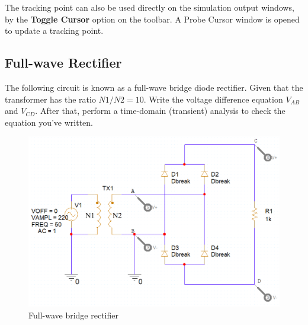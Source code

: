 The tracking point can also be used directly on the simulation output windows, by the \textbf{Toggle Cursor} option on the toolbar. A Probe Cursor window is opened to update a tracking point.




\subsection{Full-wave Rectifier}
The following circuit is known as a full-wave bridge diode rectifier. Given that the transformer has the ratio $N1/N2 = 10$. Write the voltage difference equation $V_{AB}$ and $V_{CD}$. After that, perform a time-domain (transient) analysis to check the equation you've written.

\begin{figure}[H]
    \centering
    \includegraphics[width=5in]{source/picture/bai_2/LAB2_EX4_de.png}
    \caption{Full-wave bridge rectifier}
    \label{lab2_ex4_de}
\end{figure}

